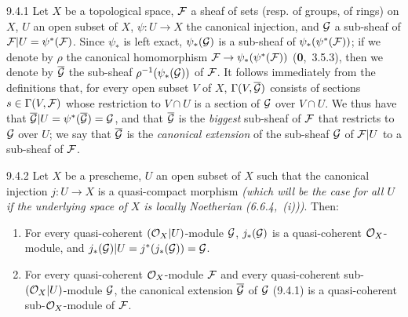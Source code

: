 \documentclass[../main.tex]{subfiles}
\begin{document}
\begin{env}{9.4.1}
    Let $X$ be a topological space, $\mathcal{F}$ a sheaf of sets (resp. of groups, of rings) on $X$, $U$ an open subset of $X$, $\psi\colon U\to X$ the canonical injection, and $\mathcal{G}$ a sub-sheaf of $\mathcal{F}|U=\psi^*(\mathcal{F})$.
    Since $\psi_*$ is left exact, $\psi_*(\mathcal{G})$ is a sub-sheaf of $\psi_*(\psi^*(\mathcal{F}))$; if we denote by $\rho$ the canonical homomorphism $\mathcal{F}\to\psi_*(\psi^*(\mathcal{F}))$ (\textbf{0},~3.5.3), then we denote by $\overline{\mathcal{G}}$ the sub-sheaf $\rho^{-1}(\psi_*(\mathcal{G}))$ of $\mathcal{F}$.
    It follows immediately from the definitions that, for every open subset $V$ of $X$, $\Gamma(V,\overline{\mathcal{G}})$ consists of sections $s\in\Gamma(V,\mathcal{F})$ whose restriction to $V\cap U$ is a section of $\mathcal{G}$ over $V\cap U$.
    We thus have that $\overline{\mathcal{G}}|U=\psi^*(\overline{\mathcal{G}})=\mathcal{G}$, and that $\overline{\mathcal{G}}$ is the \emph{biggest} sub-sheaf of $\mathcal{F}$ that restricts to $\mathcal{G}$ over $U$; we say that $\overline{\mathcal{G}}$ is the \emph{canonical extension} of the sub-sheaf $\mathcal{G}$ of $\mathcal{F}|U$ to a sub-sheaf of $\mathcal{F}$.
\end{env}

\begin{env}[Proposition]{9.4.2}
    Let $X$ be a prescheme, $U$ an open subset of $X$ such that the canonical injection $j\colon U\to X$ is a quasi-compact morphism \emph{(which will be the case for \emph{all} $U$ if the underlying space of $X$ is \emph{locally Noetherian} {\normalfont(6.6.4,~(i))})}.
    Then:
    \begin{enumerate}[label=\normalfont(\roman*)]
        \item For every quasi-coherent $(\mathcal{O}_X|U)$-module $\mathcal{G}$, $j_*(\mathcal{G})$ is a quasi-coherent $\mathcal{O}_X$-module, and $j_*(\mathcal{G})|U=j^*(j_*(\mathcal{G}))=\mathcal{G}$.
        \item For every quasi-coherent $\mathcal{O}_X$-module $\mathcal{F}$ and every quasi-coherent sub-$(\mathcal{O}_X|U)$-module $\mathcal{G}$, the canonical extension $\overline{\mathcal{G}}$ of $\mathcal{G}$ {\normalfont(9.4.1)} is a quasi-coherent sub-$\mathcal{O}_X$-module of $\mathcal{F}$.
    \end{enumerate}
\end{env}
\end{document}
